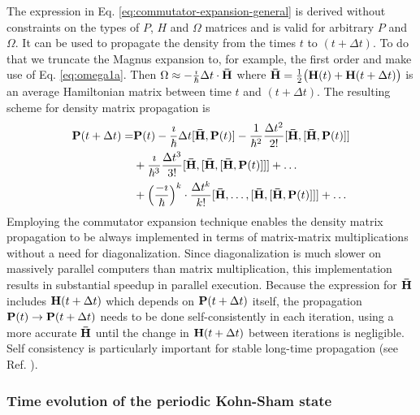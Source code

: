 \documentclass[journal=jctcce,manuscript=article,etalmode=truncate,maxauthors=10,layout=twocolumn,9pt]{achemso}   %
\begin{document}
The expression in  Eq. \ref{eq:commutator-expansion-general} is derived without 
constraints on the types of $P$, $H$ and $\Omega$ matrices  and is valid for arbitrary $P$ and $\Omega$. 
It 
can be used to  propagate the density   from the times $t$ to  $(t+\Delta t)$.
To  do that we truncate the
  Magnus expansion to, for example, the first order  and make use of  Eq. \ref{eq:omega1a}.   
Then $\Omega \approx  -\frac{\imath}{\hbar} \Delta t \cdot \vb{\bar{H}} $  
 where  $\vb{\bar{H}} = \frac{1}{2} \big( \vb{H}(t) + \vb{H}(t+\Delta t)\big)$
  is an average Hamiltonian matrix   between time $t$ and $(t+\Delta t)$.
 The resulting  scheme  for  density matrix  propagation is
\begin{align}
\vb{P}(t+\Delta t) =&   \vb{P}(t)  - \frac{\imath}{\hbar} \Delta t [\vb{\bar{H}, P}(t)] - 
\frac{1}{\hbar^2}  \frac{\Delta t^2}{ 2!} [\vb{\bar{H}, [\bar{H}, P}(t)] ]  \nonumber \\ 
   & +  
\frac{\imath}{\hbar^3}  \frac{\Delta t^3}{ 3!} [\vb{\bar{H}, [\bar{H}, [\bar{H}, P}(t)]]] +\ldots \nonumber \\
& + \Big( \frac{-\imath}{\hbar}\Big)^k\cdot\frac{\Delta t^k}{ k!}[\vb{\bar{H},\ldots, [\bar{H}, [\bar{H}, P}(t)]]] + \ldots
\label{eq:commutator-expansion}
\end{align} 
Employing  the commutator expansion technique enables the  density matrix propagation to  be always implemented  in terms of
matrix-matrix multiplications without a need for  diagonalization. Since diagonalization is much slower on massively parallel computers than matrix multiplication, this implementation results in substantial speedup in parallel execution.
Because the expression for $\vb{\bar{H}}$ includes $\vb{H}(t+\Delta t)$ which depends on $\vb{P}(t+\Delta t)$ itself, 
the propagation $\vb{P}(t)\to \vb{P}(t+\Delta t)$ needs to be done self-consistently  in each  iteration, 
using a more accurate  $\vb{\bar{H}}$  until  the change in  $\vb{H}(t+\Delta t)$  between iterations is negligible.
Self consistency is particularly important for stable long-time propagation (see Ref. \cite{lvnmd}).

\subsubsection{ Time evolution of the periodic Kohn-Sham state}
\end{document}
